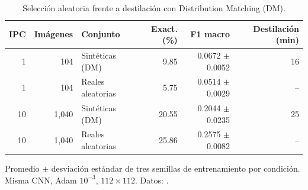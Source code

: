 \begin{table}[htbp]
\centering
\caption{Selección aleatoria frente a destilación con Distribution Matching (DM).}
\label{tab:dm}
\small
\begin{tabular}{rrlrrr}
\toprule
IPC & Imágenes & Conjunto & Exact. (\%) & F1 macro & Destilación (min) \\
\midrule
1 & 104 & Sintéticas (DM) & 9.85 & 0.0672 $\pm$ 0.0052 & 16 \\
1 & 104 & Reales aleatorias & 5.75 & 0.0514 $\pm$ 0.0029 & -- \\
10 & 1,040 & Sintéticas (DM) & 20.55 & 0.2044 $\pm$ 0.0235 & 25 \\
10 & 1,040 & Reales aleatorias & 25.86 & 0.2575 $\pm$ 0.0082 & -- \\
\bottomrule
\end{tabular}
\par\smallskip
\parbox{0.95\textwidth}{\footnotesize Promedio $\pm$ desviación estándar de tres semillas de entrenamiento por condición. Misma CNN, Adam $10^{-3}$, $112\times112$. Datos: .}
\end{table}
